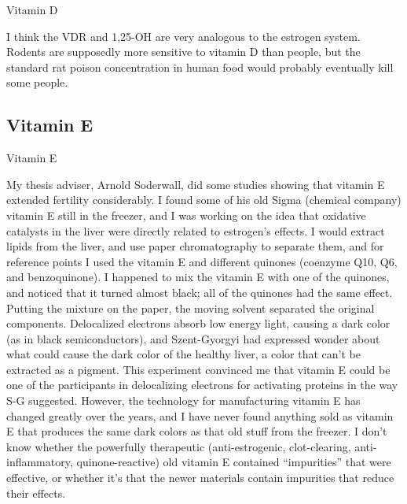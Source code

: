 \documentclass[11pt,oneside,openany,extrafontsizes]{memoir}
\begin{document}
\begin{standalonequote}{Vitamin D}

    \begin{answer}
      I think the VDR and 1,25-OH are very analogous to the estrogen system. Rodents are supposedly more sensitive to vitamin D than people, but the standard rat poison concentration in human food would probably eventually kill some people.
    \end{answer}
\end{standalonequote}

\subsection{Vitamin E}

\begin{standalonequote}{Vitamin E}

    \begin{answer}
        My thesis adviser, Arnold Soderwall, did some studies showing that vitamin E extended fertility considerably. I found some of his old Sigma (chemical company) vitamin E still in the freezer, and I was working on the idea that oxidative catalysts in the liver were directly related to estrogen's effects. I would extract lipids from the liver, and use paper chromatography to separate them, and for reference points I used the vitamin E and different quinones (coenzyme Q10, Q6, and benzoquinone). I happened to mix the vitamin E with one of the quinones, and noticed that it turned almost black; all of the quinones had the same effect. Putting the mixture on the paper, the moving solvent separated the original components. Delocalized electrons absorb low energy light, causing a dark color (as in black semiconductors), and Szent-Gyorgyi had expressed wonder about what could cause the dark color of the healthy liver, a color that can't be extracted as a pigment. This experiment convinced me that vitamin E could be one of the participants in delocalizing electrons for activating proteins in the way S-G suggested. However, the technology for manufacturing vitamin E has changed greatly over the years, and I have never found anything sold as vitamin E that produces the same dark colors as that old stuff from the freezer. I don't know whether the powerfully therapeutic (anti-estrogenic, clot-clearing, anti-inflammatory, quinone-reactive) old vitamin E contained \enquote{impurities} that were effective, or whether it's that the newer materials contain impurities that reduce their effects.
    \end{answer}
\end{standalonequote}
\end{document}
